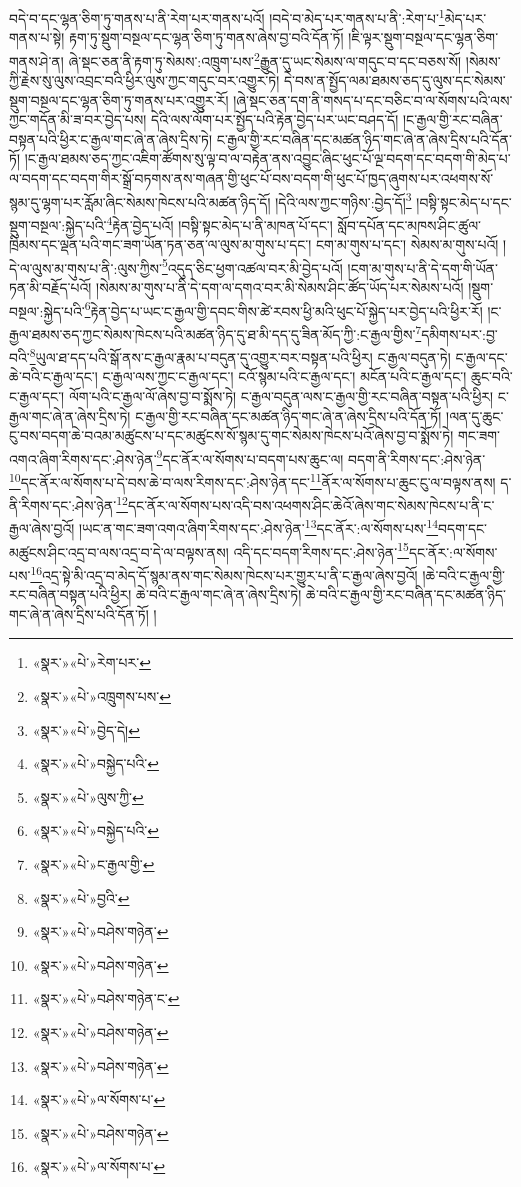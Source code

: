 བདེ་བ་དང་ལྷན་ཅིག་ཏུ་གནས་པ་ནི་རེག་པར་གནས་པའོ། །བདེ་བ་མེད་པར་གནས་པ་ནི་:རེག་པ་\footnote{«སྣར་»«པེ་»རེག་པར་}མེད་པར་གནས་པ་སྟེ། རྟག་ཏུ་སྡུག་བསྔལ་དང་ལྷན་ཅིག་ཏུ་གནས་ཞེས་བྱ་བའི་དོན་ཏོ། །ཇི་ལྟར་སྡུག་བསྔལ་དང་ལྷན་ཅིག་གནས་ཤེ་ན། ཞེ་སྡང་ཅན་ནི་རྟག་ཏུ་སེམས་:འཁྲུག་པས་\footnote{«སྣར་»«པེ་»འཁྲུགས་པས་}རྒྱུན་དུ་ཡང་སེམས་ལ་གདུང་བ་དང་བཅས་སོ། །སེམས་ཀྱི་རྗེས་སུ་ལུས་འབྲང་བའི་ཕྱིར་ལུས་ཀྱང་གདུང་བར་འགྱུར་ཏེ། དེ་བས་ན་སྤྱོད་ལམ་ཐམས་ཅད་དུ་ལུས་དང་སེམས་སྡུག་བསྔལ་དང་ལྷན་ཅིག་ཏུ་གནས་པར་འགྱུར་རོ། །ཞེ་སྡང་ཅན་དག་ནི་གསད་པ་དང་བཅིང་བ་ལ་སོགས་པའི་ལས་ཀྱང་གདོན་མི་ཟ་བར་བྱེད་པས། དེའི་ལས་ལོག་པར་སྤྱོད་པའི་རྟེན་བྱེད་པར་ཡང་བཤད་དོ། །ང་རྒྱལ་གྱི་རང་བཞིན་བསྟན་པའི་ཕྱིར་ང་རྒྱལ་གང་ཞེ་ན་ཞེས་དྲིས་ཏེ། ང་རྒྱལ་གྱི་རང་བཞིན་དང་མཚན་ཉིད་གང་ཞེ་ན་ཞེས་དྲིས་པའི་དོན་ཏོ། །ང་རྒྱལ་ཐམས་ཅད་ཀྱང་འཇིག་ཚོགས་སུ་ལྟ་བ་ལ་བརྟེན་ནས་འབྱུང་ཞིང་ཕུང་པོ་ལྔ་བདག་དང་བདག་གི་མེད་པ་ལ་བདག་དང་བདག་གིར་སྒྲོ་བཏགས་ནས་གཞན་གྱི་ཕུང་པོ་བས་བདག་གི་ཕུང་པོ་ཁྱད་ཞུགས་པར་འཕགས་སོ་སྙམ་དུ་ལྷག་པར་རློམ་ཞིང་སེམས་ཁེངས་པའི་མཚན་ཉིད་དོ། །དེའི་ལས་ཀྱང་གཉིས་:བྱེད་དོ།\footnote{«སྣར་»«པེ་»བྱེད་དེ།} །བསྟི་སྟང་མེད་པ་དང་སྡུག་བསྔལ་:སྐྱེད་པའི་\footnote{«སྣར་»«པེ་»བསྐྱེད་པའི་}རྟེན་བྱེད་པའོ། །བསྟི་སྟང་མེད་པ་ནི་མཁན་པོ་དང་། སློབ་དཔོན་དང་མཁས་ཤིང་ཚུལ་ཁྲིམས་དང་ལྡན་པའི་གང་ཟག་ཡོན་ཏན་ཅན་ལ་ལུས་མ་གུས་པ་དང་། ངག་མ་གུས་པ་དང་། སེམས་མ་གུས་པའོ། །དེ་ལ་ལུས་མ་གུས་པ་ནི་:ལུས་ཀྱིས་\footnote{«སྣར་»«པེ་»ལུས་ཀྱི་}འདུད་ཅིང་ཕྱག་འཚལ་བར་མི་བྱེད་པའོ། །ངག་མ་གུས་པ་ནི་དེ་དག་གི་ཡོན་ཏན་མི་བརྗོད་པའོ། །སེམས་མ་གུས་པ་ནི་དེ་དག་ལ་དགའ་བར་མི་སེམས་ཤིང་ཚོད་ཡོད་པར་སེམས་པའོ། །སྡུག་བསྔལ་:སྐྱེད་པའི་\footnote{«སྣར་»«པེ་»བསྐྱེད་པའི་}རྟེན་བྱེད་པ་ཡང་ང་རྒྱལ་གྱི་དབང་གིས་ཚེ་རབས་ཕྱི་མའི་ཕུང་པོ་སྐྱེད་པར་བྱེད་པའི་ཕྱིར་རོ། །ང་རྒྱལ་ཐམས་ཅད་ཀྱང་སེམས་ཁེངས་པའི་མཚན་ཉིད་དུ་ཐ་མི་དད་དུ་ཟིན་མོད་ཀྱི་:ང་རྒྱལ་གྱིས་\footnote{«སྣར་»«པེ་»ང་རྒྱལ་གྱི་}དམིགས་པར་:བྱ་བའི་\footnote{«སྣར་»«པེ་»བྱའི་}ཡུལ་ཐ་དད་པའི་སྒོ་ནས་ང་རྒྱལ་རྣམ་པ་བདུན་དུ་འགྱུར་བར་བསྟན་པའི་ཕྱིར། ང་རྒྱལ་བདུན་ཏེ། ང་རྒྱལ་དང་ཆེ་བའི་ང་རྒྱལ་དང་། ང་རྒྱལ་ལས་ཀྱང་ང་རྒྱལ་དང་། ངའོ་སྙམ་པའི་ང་རྒྱལ་དང་། མངོན་པའི་ང་རྒྱལ་དང་། ཆུང་བའི་ང་རྒྱལ་དང་། ལོག་པའི་ང་རྒྱལ་ལོ་ཞེས་བྱ་བ་སྨོས་ཏེ། ང་རྒྱལ་བདུན་ལས་ང་རྒྱལ་གྱི་རང་བཞིན་བསྟན་པའི་ཕྱིར། ང་རྒྱལ་གང་ཞེ་ན་ཞེས་དྲིས་ཏེ། ང་རྒྱལ་གྱི་རང་བཞིན་དང་མཚན་ཉིད་གང་ཞེ་ན་ཞེས་དྲིས་པའི་དོན་ཏོ། །ལན་དུ་ཆུང་ངུ་བས་བདག་ཆེ་བའམ་མཚུངས་པ་དང་མཚུངས་སོ་སྙམ་དུ་གང་སེམས་ཁེངས་པའོ་ཞེས་བྱ་བ་སྨོས་ཏེ། གང་ཟག་འགའ་ཞིག་རིགས་དང་:ཤེས་ཉེན་\footnote{«སྣར་»«པེ་»བཤེས་གཉེན་}དང་ནོར་ལ་སོགས་པ་བདག་པས་ཆུང་ལ། བདག་ནི་རིགས་དང་:ཤེས་ཉེན་\footnote{«སྣར་»«པེ་»བཤེས་གཉེན་}དང་ནོར་ལ་སོགས་པ་དེ་བས་ཆེ་བ་ལས་རིགས་དང་:ཤེས་ཉེན་དང་\footnote{«སྣར་»«པེ་»བཤེས་གཉེན་ང་}ནོར་ལ་སོགས་པ་ཆུང་ངུ་ལ་བལྟས་ནས། ད་ནི་རིགས་དང་:ཤེས་ཉེན་\footnote{«སྣར་»«པེ་»བཤེས་གཉེན་}དང་ནོར་ལ་སོགས་པས་འདི་བས་འཕགས་ཤིང་ཆེའོ་ཞེས་གང་སེམས་ཁེངས་པ་ནི་ང་རྒྱལ་ཞེས་བྱའོ། །ཡང་ན་གང་ཟག་འགའ་ཞིག་རིགས་དང་:ཤེས་ཉེན་\footnote{«སྣར་»«པེ་»བཤེས་གཉེན་}དང་ནོར་:ལ་སོགས་པས་\footnote{«སྣར་»«པེ་»ལ་སོགས་པ་}བདག་དང་མཚུངས་ཤིང་འདྲ་བ་ལས་འདྲ་བ་དེ་ལ་བལྟས་ནས། འདི་དང་བདག་རིགས་དང་:ཤེས་ཉེན་\footnote{«སྣར་»«པེ་»བཤེས་གཉེན་}དང་ནོར་:ལ་སོགས་པས་\footnote{«སྣར་»«པེ་»ལ་སོགས་པ་}འདྲ་སྟེ་མི་འདྲ་བ་མེད་དོ་སྙམ་ནས་གང་སེམས་ཁེངས་པར་གྱུར་པ་ནི་ང་རྒྱལ་ཞེས་བྱའོ། །ཆེ་བའི་ང་རྒྱལ་གྱི་རང་བཞིན་བསྟན་པའི་ཕྱིར། ཆེ་བའི་ང་རྒྱལ་གང་ཞེ་ན་ཞེས་དྲིས་ཏེ། ཆེ་བའི་ང་རྒྱལ་གྱི་རང་བཞིན་དང་མཚན་ཉིད་གང་ཞེ་ན་ཞེས་དྲིས་པའི་དོན་ཏོ། །
